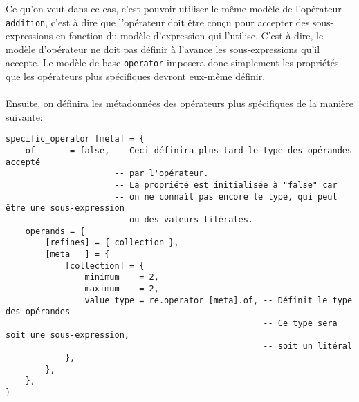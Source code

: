 \documentclass{article}
\begin{document}
\noindent Ce qu'on veut dans ce cas, c'est pouvoir utiliser le même modèle de l'opérateur \lstinline|addition|, c'est à dire que l'opérateur doit être conçu pour accepter des sous-expressions en fonction du modèle d'expression qui l'utilise. C'est-à-dire, le modèle d'opérateur ne doit pas définir à l'avance les sous-expressions qu'il accepte. Le modèle de base \lstinline|operator| imposera donc simplement les propriétés que les opérateurs plus spécifiques devront eux-même définir. \\
\ \\
Ensuite, on définira les métadonnées des opérateurs plus spécifiques de la manière suivante:
\begin{verbatim}
specific_operator [meta] = {
	of       = false, -- Ceci définira plus tard le type des opérandes accepté
	                  -- par l'opérateur.
	                  -- La propriété est initialisée à "false" car 
	                  -- on ne connaît pas encore le type, qui peut être une sous-expression
	                  -- ou des valeurs litérales.
	operands = {
		[refines] = { collection },
		[meta   ] = {
			[collection] = {
				minimum    = 2,
				maximum    = 2,
				value_type = re.operator [meta].of, -- Définit le type des opérandes
				                                    -- Ce type sera soit une sous-expression, 
				                                    -- soit un litéral
			},
		},
	},
}
\end{verbatim}
\end{document}
